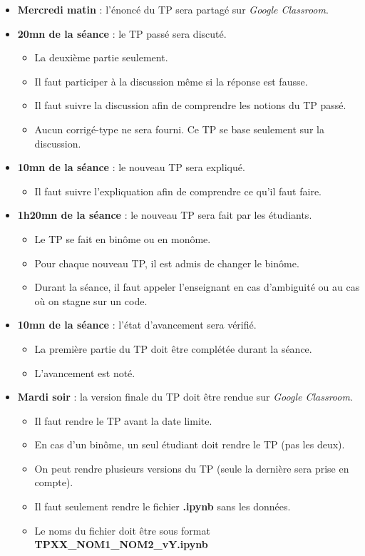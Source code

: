 \documentclass[11pt, a4paper]{article}
\begin{document}
\begin{itemize}
	\item \textbf{Mercredi matin} : l'énoncé du TP sera partagé sur \textit{Google Classroom}.
	
	\item \textbf{20mn de la séance} : le TP passé sera discuté.
	\begin{itemize}
		\item La deuxième partie seulement.
		\item Il faut participer à la discussion même si la réponse est fausse.
		\item Il faut suivre la discussion afin de comprendre les notions du TP passé.
		\item Aucun corrigé-type ne sera fourni. Ce TP se base seulement sur la discussion.
	\end{itemize}

	\item \textbf{10mn de la séance} : le nouveau TP sera expliqué.
	\begin{itemize}
		\item Il faut suivre l'expliquation afin de comprendre ce qu'il faut faire.
	\end{itemize}
	
	\item \textbf{1h20mn de la séance} : le nouveau TP sera fait par les étudiants.
	\begin{itemize}
		\item Le TP se fait en binôme ou en monôme.
		\item Pour chaque nouveau TP, il est admis de changer le binôme.
		\item Durant la séance, il faut appeler l'enseignant en cas d'ambiguité ou au cas où on stagne sur un code.
	\end{itemize}

	\item \textbf{10mn de la séance} : l'état d'avancement sera vérifié.
	\begin{itemize}
		\item La première partie du TP doit être complétée durant la séance.
		\item L'avancement est noté.
	\end{itemize}

	\item \textbf{Mardi soir} : la version finale du TP doit être rendue sur \textit{Google Classroom}.
	\begin{itemize}
		\item Il faut rendre le TP avant la date limite.
		\item En cas d'un binôme, un seul étudiant doit rendre le TP (pas les deux).
		\item On peut rendre plusieurs versions du TP (seule la dernière sera prise en compte).
		\item Il faut seulement rendre le fichier \textbf{.ipynb} sans les données.
		\item Le noms du fichier doit être sous format \textbf{TPXX\_NOM1\_NOM2\_vY.ipynb}
	\end{itemize}

\end{itemize}
\end{document}
